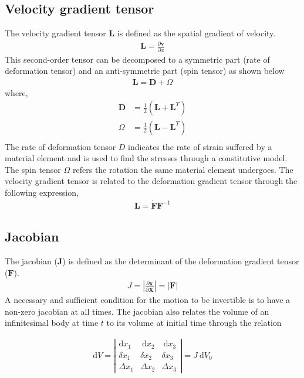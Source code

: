 \subsection*{Velocity gradient tensor}
The velocity gradient tensor $\mathbf{L}$ is defined as the spatial gradient of velocity. 
\begin{align}
\mathbf{L} = \frac{\partial \mathbf{v}}{\partial x}
\end{align}
This second-order tensor can be decomposed to a symmetric part (rate of deformation tensor) and an anti-symmetric part (spin tensor) as shown below 
\begin{align}
\mathbf{L} = \mathbf{D}+{\Omega} 
\end{align}
where,
\begin{align}
\mathbf{D} &= \frac{1}{2} (\mathbf{L}+\mathbf{L}^T)\\
\Omega &= \frac{1}{2} (\mathbf{L}-\mathbf{L}^T)\\
\end{align}
The rate of deformation tensor $D$ indicates the rate of strain suffered by a material element and is used to find the stresses through a constitutive model. The spin tensor $\Omega$ refers the rotation the same material element undergoes.
The velocity gradient tensor is related to the deformation gradient tensor through the following expression,
\begin{align}
\mathbf{L} = \dot{\mathbf{F}}\mathbf{F}^{-1}
\end{align}

\subsection*{Jacobian}
The jacobian ($\mathbf{J}$) is defined as the determinant of the deformation gradient tensor ($\mathbf{F}$). 
\begin{align}
	J=\left|\frac{\partial \mathbf{x}}{\partial \mathbf{X}}\right| = \left| \mathbf{F} \right|
\end{align}
A necessary and sufficient condition for the motion to be invertible is to have a non-zero jacobian at all times. The jacobian also relates the volume of an infinitesimal body at time $t$ to its volume at initial time through the relation

\begin{align}
\mathrm{d} V=\left|\begin{array}{ccc}\mathrm{d} x_1 & \mathrm{~d} x_2 & \mathrm{~d} x_3 \\ \delta x_1 & \delta x_2 & \delta x_3 \\ \Delta x_1 & \Delta x_2 & \Delta x_3\end{array}\right|=J \mathrm{~d} V_0
\end{align}

